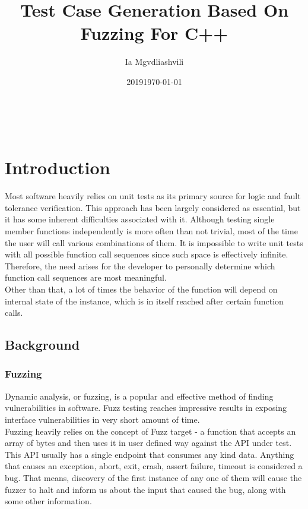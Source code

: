 \documentclass{elteikthesis}[2018/06/06]
\date{2019}
\affiliation{Associate Professor, PhD}
\author{Ia Mgvdliashvili}
\date{\today}
\title{Test Case Generation Based On Fuzzing For C++}
\renewcommand{\footnote}{\endnote}
\begin{document}
\maketitle
\setcounter{page}{1} \\
\setcounter{tocdepth}{0}
\tableofcontents

\chapter{Introduction}
\label{sec-1}
Most software heavily relies on unit tests as its primary source for logic and fault tolerance verification. This approach has been largely considered as essential, but it has some inherent difficulties associated with it. Although testing single member functions independently is more often than not trivial, most of the time the user will call various combinations of them. It is impossible to write unit tests with all possible function call sequences since such space is effectively infinite. Therefore, the need arises for the developer to personally determine which function call sequences are most meaningful. \\

Other than that, a lot of times the behavior of the function will depend on internal state of the instance, which is in itself reached after certain function calls. \\
\section{Background}
\label{sec-1-1}
\subsection{Fuzzing}
\label{sec-1-1-1}
Dynamic analysis, or fuzzing, is a popular and effective method of finding vulnerabilities in software. Fuzz testing reaches impressive results in exposing interface vulnerabilities in very short amount of time. \\

Fuzzing heavily relies on the concept of Fuzz target - a function that accepts an array of bytes and then uses it in user defined way against the API under test. This API usually has a single endpoint that consumes any kind data. Anything that causes an exception, abort, exit, crash, assert failure, timeout is considered a bug\footnote{DEFINITION NOT FOUND.}. That means, discovery of the first instance of any one of them will cause the fuzzer to halt and inform us about the input that caused the bug, along with some other information. \\
\end{document}
